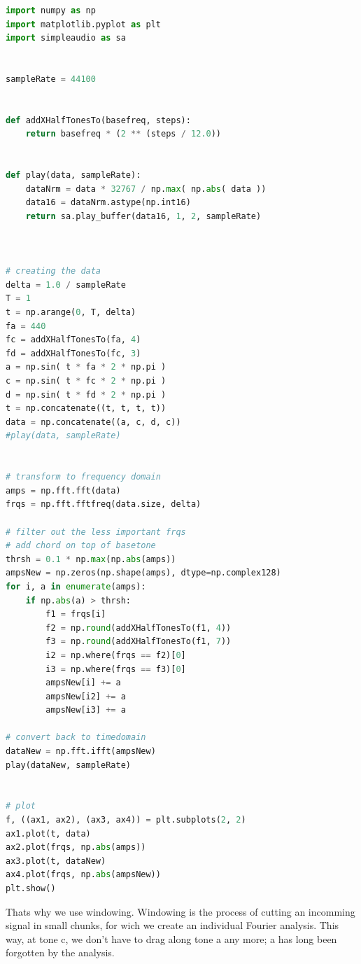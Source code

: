 \begin{lstlisting}[language=python]
import numpy as np
import matplotlib.pyplot as plt
import simpleaudio as sa


sampleRate = 44100


def addXHalfTonesTo(basefreq, steps):
    return basefreq * (2 ** (steps / 12.0))


def play(data, sampleRate):
    dataNrm = data * 32767 / np.max( np.abs( data ))
    data16 = dataNrm.astype(np.int16)
    return sa.play_buffer(data16, 1, 2, sampleRate)



# creating the data
delta = 1.0 / sampleRate
T = 1
t = np.arange(0, T, delta)
fa = 440
fc = addXHalfTonesTo(fa, 4)
fd = addXHalfTonesTo(fc, 3)
a = np.sin( t * fa * 2 * np.pi )
c = np.sin( t * fc * 2 * np.pi )
d = np.sin( t * fd * 2 * np.pi )
t = np.concatenate((t, t, t, t))
data = np.concatenate((a, c, d, c))
#play(data, sampleRate)


# transform to frequency domain
amps = np.fft.fft(data)
frqs = np.fft.fftfreq(data.size, delta)

# filter out the less important frqs
# add chord on top of basetone
thrsh = 0.1 * np.max(np.abs(amps))
ampsNew = np.zeros(np.shape(amps), dtype=np.complex128)
for i, a in enumerate(amps):
    if np.abs(a) > thrsh:
        f1 = frqs[i]
        f2 = np.round(addXHalfTonesTo(f1, 4))
        f3 = np.round(addXHalfTonesTo(f1, 7))
        i2 = np.where(frqs == f2)[0]
        i3 = np.where(frqs == f3)[0]
        ampsNew[i] += a
        ampsNew[i2] += a
        ampsNew[i3] += a

# convert back to timedomain
dataNew = np.fft.ifft(ampsNew)
play(dataNew, sampleRate)


# plot
f, ((ax1, ax2), (ax3, ax4)) = plt.subplots(2, 2)
ax1.plot(t, data)
ax2.plot(frqs, np.abs(amps))
ax3.plot(t, dataNew)
ax4.plot(frqs, np.abs(ampsNew))
plt.show()

\end{lstlisting}


Thats why we use windowing. Windowing is the process of cutting an incomming signal in small chunks, for wich we create an individual Fourier analysis. This way, at tone c, we don't have to drag along tone a any more; a has long been forgotten by the analysis. 



